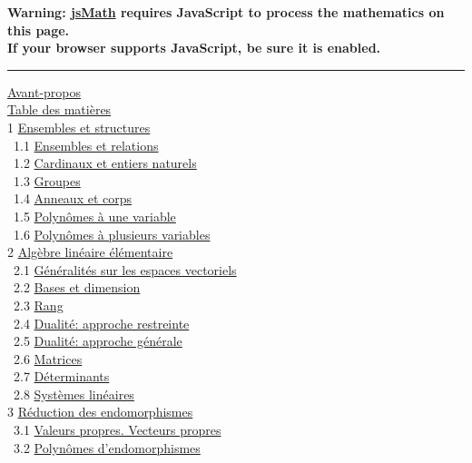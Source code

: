 \documentclass[]{article}
\author{}
\date{}
\begin{document}
\textbf{Warning: \href{http://www.math.union.edu/locate/jsMath}{jsMath}
requires JavaScript to process the mathematics on this page.\\ If your
browser supports JavaScript, be sure it is enabled.}

\begin{center}\rule{3in}{0.4pt}\end{center}

\href{coursch1.html\#x2-1000}{Avant-propos} \\
\href{coursli1.html\#x3-5000}{Table des matières} \\ 1
\href{coursch2.html\#x4-60001}{Ensembles et structures} \\ ~1.1
\href{coursse1.html\#x5-70001.1}{Ensembles et relations} \\ ~1.2
\href{coursse2.html\#x6-120001.2}{Cardinaux et entiers naturels} \\ ~1.3
\href{coursse3.html\#x7-150001.3}{Groupes} \\ ~1.4
\href{coursse4.html\#x8-260001.4}{Anneaux et corps} \\ ~1.5
\href{coursse5.html\#x9-360001.5}{Polynômes à une variable} \\ ~1.6
\href{coursse6.html\#x10-460001.6}{Polynômes à plusieurs variables} \\ 2
\href{coursch3.html\#x11-510002}{Algèbre linéaire élémentaire} \\ ~2.1
\href{coursse7.html\#x12-520002.1}{Généralités sur les espaces
vectoriels} \\ ~2.2 \href{coursse8.html\#x13-610002.2}{Bases et
dimension} \\ ~2.3 \href{coursse9.html\#x14-650002.3}{Rang} \\ ~2.4
\href{coursse10.html\#x15-680002.4}{Dualité: approche restreinte} \\
~2.5 \href{coursse11.html\#x16-750002.5}{Dualité: approche générale} \\
~2.6 \href{coursse12.html\#x17-810002.6}{Matrices} \\ ~2.7
\href{coursse13.html\#x18-890002.7}{Déterminants} \\ ~2.8
\href{coursse14.html\#x19-960002.8}{Systèmes linéaires} \\ 3
\href{coursch4.html\#x20-1010003}{Réduction des endomorphismes} \\ ~3.1
\href{coursse15.html\#x21-1020003.1}{Valeurs propres. Vecteurs propres}
\\ ~3.2 \href{coursse16.html\#x22-1090003.2}{Polynômes d'endomorphismes}
\end{document}
